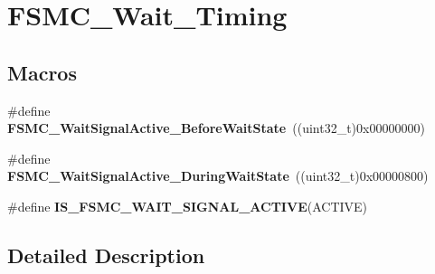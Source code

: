 \hypertarget{group___f_s_m_c___wait___timing}{\section{F\-S\-M\-C\-\_\-\-Wait\-\_\-\-Timing}
\label{group___f_s_m_c___wait___timing}
}
\subsection*{Macros}
\begin{DoxyCompactItemize}
\item 
\hypertarget{group___f_s_m_c___wait___timing_ga62c6855a7cc65b20024085f09cdc65e8}{\#define {\bfseries F\-S\-M\-C\-\_\-\-Wait\-Signal\-Active\-\_\-\-Before\-Wait\-State}~((uint32\-\_\-t)0x00000000)}\label{group___f_s_m_c___wait___timing_ga62c6855a7cc65b20024085f09cdc65e8}

\item 
\hypertarget{group___f_s_m_c___wait___timing_gae905fc59e5d99091d132d7c221c8b6d4}{\#define {\bfseries F\-S\-M\-C\-\_\-\-Wait\-Signal\-Active\-\_\-\-During\-Wait\-State}~((uint32\-\_\-t)0x00000800)}\label{group___f_s_m_c___wait___timing_gae905fc59e5d99091d132d7c221c8b6d4}

\item 
\#define {\bfseries I\-S\-\_\-\-F\-S\-M\-C\-\_\-\-W\-A\-I\-T\-\_\-\-S\-I\-G\-N\-A\-L\-\_\-\-A\-C\-T\-I\-V\-E}(A\-C\-T\-I\-V\-E)
\end{DoxyCompactItemize}


\subsection{Detailed Description}



